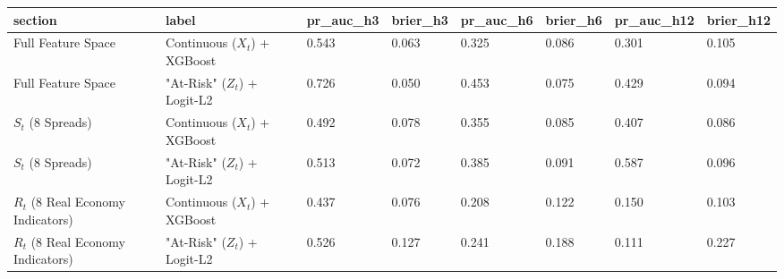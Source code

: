 \begin{tabular}{llllllll}
\toprule
section & label & pr_auc_h3 & brier_h3 & pr_auc_h6 & brier_h6 & pr_auc_h12 & brier_h12 \\
\midrule
Full Feature Space & Continuous ($X_t$) + XGBoost & 0.543 & 0.063 & 0.325 & 0.086 & 0.301 & 0.105 \\
Full Feature Space & "At-Risk" ($Z_t$) + Logit-L2 & 0.726 & 0.050 & 0.453 & 0.075 & 0.429 & 0.094 \\
$S_t$ (8 Spreads) & Continuous ($X_t$) + XGBoost & 0.492 & 0.078 & 0.355 & 0.085 & 0.407 & 0.086 \\
$S_t$ (8 Spreads) & "At-Risk" ($Z_t$) + Logit-L2 & 0.513 & 0.072 & 0.385 & 0.091 & 0.587 & 0.096 \\
$R_t$ (8 Real Economy Indicators) & Continuous ($X_t$) + XGBoost & 0.437 & 0.076 & 0.208 & 0.122 & 0.150 & 0.103 \\
$R_t$ (8 Real Economy Indicators) & "At-Risk" ($Z_t$) + Logit-L2 & 0.526 & 0.127 & 0.241 & 0.188 & 0.111 & 0.227 \\
\bottomrule
\end{tabular}
